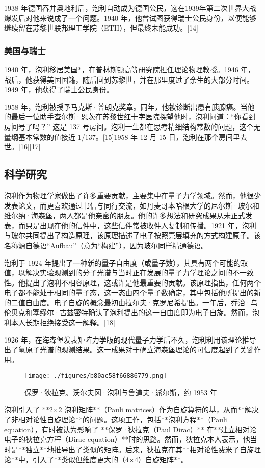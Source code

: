 1938 年德国吞并奥地利后，泡利自动成为德国公民，这在1939年第二次世界大战爆发后对他来说成了一个问题。1940 年，他曾试图获得瑞士公民身份，以便能够继续留在苏黎世联邦理工学院（ETH），但最终未能成功。[14]
\subsubsection{美国与瑞士} 
1940 年，泡利移居美国*，在普林斯顿高等研究院担任理论物理教授。1946 年，战后，他获得美国国籍，随后回到苏黎世，并在那里度过了余生的大部分时间。1949 年，他获得了瑞士公民身份。

1958 年，泡利被授予马克斯·普朗克奖章。同年，他被诊断出患有胰腺癌。当他的最后一位助手查尔斯·恩茨在苏黎世红十字医院探望他时，泡利问道：“你看到房间号了吗？” 这是 137 号房间。泡利一生都在思考精细结构常数的问题，这个无量纲基本常数的值接近 1/137。[15]1958 年 12 月 15 日，泡利在那个房间里去世。[16][17]
\subsection{科学研究}
泡利作为物理学家做出了许多重要贡献，主要集中在量子力学领域。然而，他很少发表论文，而更喜欢通过书信与同行交流，如丹麦哥本哈根大学的尼尔斯·玻尔和维尔纳·海森堡，两人都是他亲密的朋友。他的许多想法和研究成果从未正式发表，而只是出现在他的信件中，这些信件常被收件人复制和传播。1921 年，泡利与玻尔共同提出了构造原理，该原理描述了电子按照壳层填充的方式构建原子。该名称源自德语“Aufbau”（意为“构建”），因为玻尔同样精通德语。

泡利于 1924 年提出了一种新的量子自由度（或量子数），其具有两个可能的取值，以解决实验观测到的分子光谱与当时正在发展的量子力学理论之间的不一致性。他提出了泡利不相容原理，这或许是他最重要的贡献。该原理指出，任何两个电子都不能处于相同的量子态，这一态由四个量子数确定，其中包括他所提出的新的二值自由度。电子自旋的概念最初由拉尔夫·克罗尼希提出。一年后，乔治·乌伦贝克和塞缪尔·古兹密特确认了泡利提出的这一自由度即为电子自旋。然而，泡利本人长期拒绝接受这一解释。[18]  

1926 年，在海森堡发表矩阵力学版的现代量子力学后不久，泡利利用该理论推导出了氢原子光谱的观测结果。这一成果对于确立海森堡理论的可信度起到了关键作用。
\begin{figure}[ht]
\centering
\texttt{[image: ./figures/b80ac58f66886779.png]}
\caption{保罗·狄拉克、沃尔夫冈·泡利与鲁道夫·派尔斯，约 1953 年} \label{fig_Pauli2_3}
\end{figure}
泡利引入了 **2×2 泡利矩阵**（Pauli matrices）作为自旋算符的基，从而**解决了非相对论性自旋理论**的问题。这项工作，包括**泡利方程**（Pauli equation），有时被认为影响了 **保罗·狄拉克（Paul Dirac）** 在**建立相对论电子的狄拉克方程（Dirac equation）**时的思路。然而，狄拉克本人表示，他当时是**独立**地推导出了类似的矩阵。后来，狄拉克在其**相对论性费米子自旋理论**中，引入了**类似但维度更大的（4×4）自旋矩阵**。

